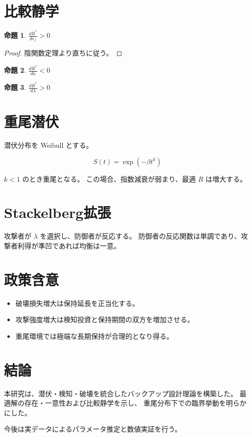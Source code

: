 \documentclass[12pt,a4paper]{article}
\theoremstyle{plain}
\newtheorem{proposition}{命題}
\begin{document}
\section{比較静学}

\begin{proposition}
$\frac{dR^*}{dc_f}>0$
\end{proposition}

\begin{proof}
陰関数定理より直ちに従う。
\end{proof}

\begin{proposition}
$\frac{dR^*}{da}<0$
\end{proposition}

\begin{proposition}
$\frac{dR^*}{d\lambda}>0$
\end{proposition}

\section{重尾潜伏}

潜伏分布を Weibull とする。

\[
S(t)=\exp(-\beta t^k)
\]

$k<1$ のとき重尾となる。
この場合、指数減衰が弱まり、最適 $R$ は増大する。

\section{Stackelberg拡張}

攻撃者が $\lambda$ を選択し、防御者が反応する。
防御者の反応関数は単調であり、攻撃者利得が準凹であれば均衡は一意。

\section{政策含意}

\begin{itemize}
\item 破壊損失増大は保持延長を正当化する。
\item 攻撃強度増大は検知投資と保持期間の双方を増加させる。
\item 重尾環境では極端な長期保持が合理的となり得る。
\end{itemize}

\section{結論}

本研究は、潜伏・検知・破壊を統合したバックアップ設計理論を構築した。
最適解の存在・一意性および比較静学を示し、
重尾分布下での臨界挙動を明らかにした。

今後は実データによるパラメータ推定と数値実証を行う。



\end{document}
